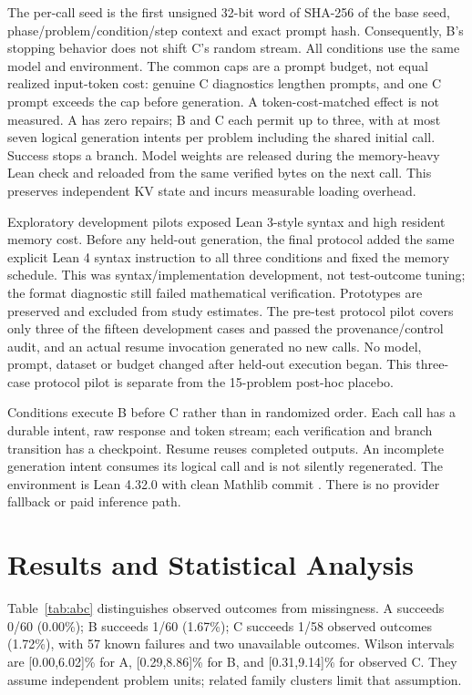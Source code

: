 \documentclass[runningheads,a4paper]{llncs}
\begin{document}
The per-call seed is the first unsigned 32-bit word of SHA-256 of the base
seed, phase/problem/condition/step context and exact prompt hash. Consequently,
B's stopping behavior does not shift C's random stream. All conditions use
the same model and environment. The common caps are a prompt budget, not equal
realized input-token cost: genuine C diagnostics lengthen prompts, and one C
prompt exceeds the cap before generation. A token-cost-matched effect is not measured. A has zero repairs; B and C each permit up to
three, with at most seven logical generation intents per problem including the shared
initial call. Success stops a branch. Model weights are released during the
memory-heavy Lean check and reloaded from the same verified bytes on the next
call. This preserves independent KV state and incurs measurable loading overhead.

Exploratory development pilots exposed Lean 3-style syntax and high resident
memory cost. Before any held-out generation, the final protocol added the same
explicit Lean 4 syntax instruction to all three conditions and fixed the memory
schedule. This was syntax/implementation development, not test-outcome tuning;
the format diagnostic still failed mathematical verification. Prototypes are
preserved and excluded from study estimates. The pre-test protocol pilot covers only three of the fifteen development cases and passed
the provenance/control audit, and an actual resume invocation generated no new
calls. No model, prompt, dataset or budget changed after held-out execution began.
This three-case protocol pilot is separate from the 15-problem post-hoc placebo.

Conditions execute B before C rather than in randomized order. Each call has a
durable intent, raw response and token stream; each verification and branch
transition has a checkpoint. Resume reuses completed outputs. An incomplete
generation intent consumes its logical call and is not silently regenerated.
The environment is Lean 4.32.0 with clean Mathlib commit
. There is no provider fallback or paid inference path.

\section{Results and Statistical Analysis}
Table~\ref{tab:abc} distinguishes observed outcomes from missingness. A succeeds
0/60 (0.00\%); B succeeds 1/60 (1.67\%); C succeeds 1/58 observed outcomes
(1.72\%), with 57 known failures and two unavailable outcomes. Wilson intervals
are [0.00,6.02]\% for A, [0.29,8.86]\% for B, and [0.31,9.14]\% for observed C.
They assume independent problem units; related family clusters limit that assumption.
\end{document}
